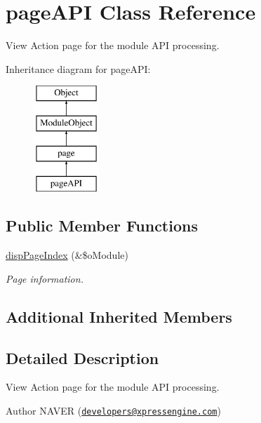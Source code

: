 \hypertarget{classpageAPI}{}\section{page\+A\+PI Class Reference}
\label{classpageAPI}


View Action page for the module A\+PI processing.  


Inheritance diagram for page\+A\+PI\+:\begin{figure}[H]
\begin{center}
\leavevmode
\includegraphics[height=4.000000cm]{classpageAPI}
\end{center}
\end{figure}
\subsection*{Public Member Functions}
\begin{DoxyCompactItemize}
\item 
\hyperlink{classpageAPI_a75a866f5715bbd74bdd977676027cd20}{disp\+Page\+Index} (\&\$o\+Module)
\begin{DoxyCompactList}\small\item\em Page information. \end{DoxyCompactList}\end{DoxyCompactItemize}
\subsection*{Additional Inherited Members}


\subsection{Detailed Description}
View Action page for the module A\+PI processing. 

\begin{DoxyAuthor}{Author}
N\+A\+V\+ER (\href{mailto:developers@xpressengine.com}{\tt developers@xpressengine.\+com}) 
\end{DoxyAuthor}


